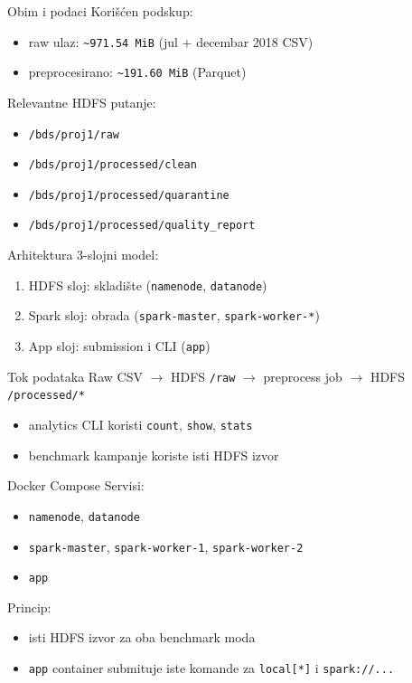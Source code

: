 \documentclass[aspectratio=169,11pt]{beamer}
\newcommand{\code}[1]{\texttt{\small #1}}
\begin{document}
\begin{frame}{Obim i podaci}
  Korišćen podskup:
  \begin{itemize}
    \item raw ulaz: \code{\textasciitilde 971.54 MiB} (jul + decembar 2018 CSV)
    \item preprocesirano: \code{\textasciitilde 191.60 MiB} (Parquet)
  \end{itemize}

  \vspace{0.35cm}
  Relevantne HDFS putanje:
  \begin{itemize}
    \item \code{/bds/proj1/raw}
    \item \code{/bds/proj1/processed/clean}
    \item \code{/bds/proj1/processed/quarantine}
    \item \code{/bds/proj1/processed/quality\_report}
  \end{itemize}
\end{frame}

\begin{frame}{Arhitektura}
  3-slojni model:
  \begin{enumerate}
    \item HDFS sloj: skladište (\code{namenode}, \code{datanode})
    \item Spark sloj: obrada (\code{spark-master}, \code{spark-worker-*})
    \item App sloj: submission i CLI (\code{app})
  \end{enumerate}

  \vspace{0.35cm}
  \begin{block}{Tok podataka}
    Raw CSV $\rightarrow$ HDFS \code{/raw} $\rightarrow$ preprocess job $\rightarrow$ HDFS \code{/processed/*}
  \end{block}

  \begin{itemize}
    \item analytics CLI koristi \code{count}, \code{show}, \code{stats}
    \item benchmark kampanje koriste isti HDFS izvor
  \end{itemize}
\end{frame}

\begin{frame}{Docker Compose}
  Servisi:
  \begin{itemize}
    \item \code{namenode}, \code{datanode}
    \item \code{spark-master}, \code{spark-worker-1}, \code{spark-worker-2}
    \item \code{app}
  \end{itemize}

  \vspace{0.35cm}
  Princip:
  \begin{itemize}
    \item isti HDFS izvor za oba benchmark moda
    \item \code{app} container submituje iste komande za \code{local[*]} i \code{spark://...}
  \end{itemize}
\end{frame}
\end{document}
